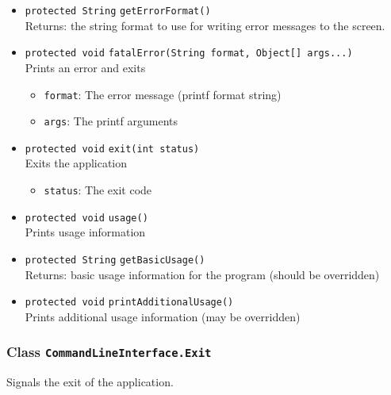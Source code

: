 \begin{itemize}
\item \lstinline|protected String| \lstinline|getErrorFormat|\lstinline|()|\\
Returns: the string format to use for writing error messages to the
 screen.



\item \lstinline|protected void| \lstinline|fatalError|\lstinline|(String format, Object[] args...)|\\
Prints an error and exits
\begin{itemize}
\item \lstinline|format|: The error message (printf format string)
\item \lstinline|args|: The printf arguments
\end{itemize}



\item \lstinline|protected void| \lstinline|exit|\lstinline|(int status)|\\
Exits the application
\begin{itemize}
\item \lstinline|status|: The exit code
\end{itemize}



\item \lstinline|protected void| \lstinline|usage|\lstinline|()|\\
Prints usage information



\item \lstinline|protected String| \lstinline|getBasicUsage|\lstinline|()|\\
Returns: basic usage information for the program (should be overridden)



\item \lstinline|protected void| \lstinline|printAdditionalUsage|\lstinline|()|\\
Prints additional usage information (may be overridden)



\end{itemize}

\subsubsection{Class \lstinline|CommandLineInterface.Exit|}
Signals the exit of the application. \\



